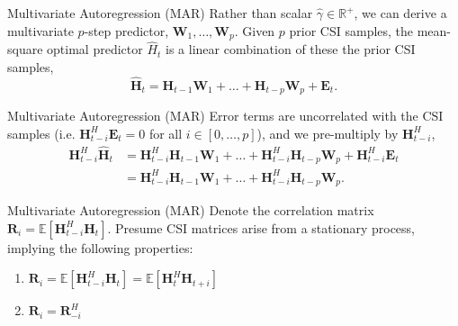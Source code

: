 \documentclass{beamer}
\begin{document}
  \begin{frame}{Multivariate Autoregression (MAR)}
    Rather than scalar $\hat\gamma \in \mathbb R^+$, we can derive a multivariate $p$-step predictor, $\mathbf W_1, \dots, \mathbf W_p$.
    Given $p$ prior CSI samples, the mean-square optimal predictor
    $\hat H_t$ is a linear combination of these the prior CSI samples,
    \begin{equation}
    \mathbf{\hat H}_{t} = \mathbf{H}_{t-1} \mathbf W_{1} + \dots + \mathbf{H}_{t-p} \mathbf W_{p} + \mathbf E_t.
    \end{equation}
  \end{frame}

  \begin{frame}{Multivariate Autoregression (MAR)}
    Error terms are uncorrelated with the CSI samples
    (i.e. $\mathbf H_{t-i}^H \mathbf E_t = 0$ for all $i \in [0, \dots, p]$),
    and we pre-multiply by $\mathbf H_{t-i}^H$,
    \begin{align}
    \mathbf{H}_{t-i}^H\mathbf{\hat H}_{t} &= \mathbf{H}_{t-i}^H\mathbf{H}_{t-1} \mathbf W_{1} + \dots + \mathbf{H}_{t-i}^H\mathbf{H}_{t-p} \mathbf W_{p} + \mathbf{H}_{t-i}^H\mathbf E_t \nonumber \\
                        &= \mathbf{H}_{t-i}^H\mathbf{H}_{t-1} \mathbf W_{1} + \dots + \mathbf{H}_{t-i}^H\mathbf{H}_{t-p} \mathbf W_{p}. \label{eq:var-init}
    \end{align}
  \end{frame}

  \begin{frame}{Multivariate Autoregression (MAR)}
    Denote the correlation matrix 
    $\mathbf R_i = \mathbb E [\mathbf H^H_{t-i}\mathbf H_{t}]$.
    Presume CSI matrices arise from a 
    stationary process, implying the following properties:
    \begin{enumerate}
      \item $\mathbf R_i = \mathbb E [\mathbf H^H_{t-i}\mathbf H_{t}] = \mathbb E [\mathbf H^H_{t}\mathbf H_{t+i}]$
      \item $\mathbf R_i = \mathbf R^H_{-i}$
    \end{enumerate}
  \end{frame}
\end{document}
